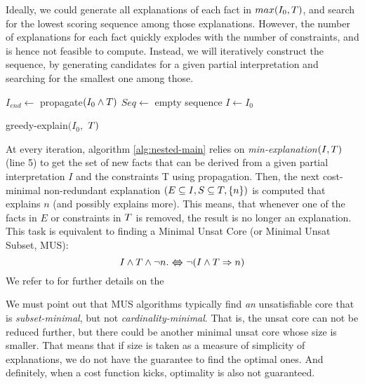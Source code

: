 Ideally, we could generate all explanations of each fact in $max(I_0,T)$, and search for the lowest scoring sequence among those explanations.
However, the number of explanations for each fact quickly explodes with the number of constraints, and is hence not feasible to compute.
Instead, we will iteratively construct the sequence, by generating candidates for a given partial interpretation and searching for the smallest one among those.

\begin{algorithm}[ht]
  $I_{end} \gets$ propagate$(I_0\land T)$\;
  $Seq \gets$ empty sequence\;
  $I \gets I_0$\;
  \caption{greedy-explain$(I_0,$ $T)$}
  \label{alg:nested-main}
\end{algorithm}

At every iteration, algorithm \ref{alg:nested-main} relies on \textit{min-explanation$(I,T)$} (line 5) to get the set of new facts that can be derived from a given partial interpretation $I$ and the constraints T using propagation.
Then, the next cost-minimal non-redundant explanation $(E \subseteq I, S \subseteq T,\{n\})$ is computed that explains $n$ (and possibly explains more).
This means, that whenever one of the facts in $E$ or constraints in $T$ is removed, the result is no longer an explanation.
This task is equivalent to finding a Minimal Unsat Core (or Minimal Unsat Subset, MUS):
\[ I \wedge \allconstraints \wedge \lnot n. \xLleftRrightarrow{} \lnot (I \wedge T \Rightarrow n) \]
We refer to \cite{ecai2020} for further details on the 

We must point out that MUS algorithms typically find \textit{an} unsatisfiable core that is \textit{subset-minimal}, but not \textit{cardinality-minimal}.
That is, the unsat core can not be reduced further, but there could be another minimal unsat core whose size is smaller.
That means that if size is taken as a measure of simplicity of explanations, we do not have the guarantee to find the optimal ones.
And definitely, when a cost function kicks, optimality is also not guaranteed.



